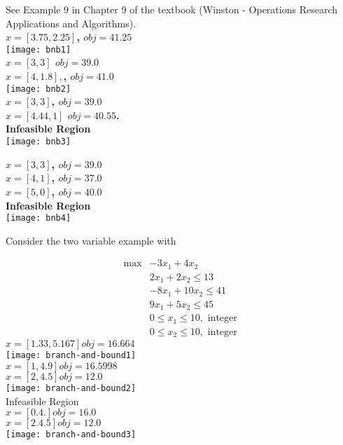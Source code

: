 \documentclass[../open-optimization/open-optimization.tex]{subfiles}
\begin{document}
\begin{example}{}{}
See Example 9 in Chapter 9 of the textbook (Winston  - Operations Research Applications and Algorithms).\\



\textbf{$x =  [3.75, 2.25]$,  $obj =  41.25$}\\
\texttt{[image: bnb1]}\\

\textbf{$x =  [3, 3]$ $obj =  39.0$}\\
\textbf{$x =  [4,  1.8],$,  $obj =  41.0$}\\
\texttt{[image: bnb2]}\\

\textbf{$x =  [3, 3]$,  $obj =  39.0$}\\
\textbf{$x =  [4.44,  1       ]$  $obj =  40.55$.}\\
\textbf{Infeasible Region}\\
\texttt{[image: bnb3]}

\textbf{$x =  [3, 3]$,  $obj =  39.0$}\\
\textbf{$x =  [4, 1]$,  $obj =  37.0$}\\
\textbf{$x =  [5, 0]$,  $obj =  40.0$}\\
\textbf{Infeasible Region}\\
\texttt{[image: bnb4]}\\

\end{example}
\newpage
\begin{example}{}{}
Consider the two variable example with
 
 \begin{align*}
 \max & -3x_1 + 4x_2\\
 & 2x_1 + 2 x_2 \leq 13\\
 & -8 x_1 + 10x_2 \leq 41\\
 & 9x_1 + 5x_2 \leq 45\\
 & 0 \leq x_1 \leq 10, \text{ integer }\\
 & 0 \leq x_2 \leq 10, \text{ integer }
 \end{align*}
$x =  [1.33, 5.167]  obj =  16.664$\\
\noindent \texttt{[image: branch-and-bound1]}\\
$x =  [1,  4.9]  obj =  16.5998$\\
$x =  [2,  4.5]  obj =  12.0$\\
\texttt{[image: branch-and-bound2]}\\
Infeasible Region\\
$x =  [0. 4.]  obj =  16.0$\\
$x =  [2.  4.5]  obj =  12.0$\\
\texttt{[image: branch-and-bound3]}\\

\end{example}
\end{document}

